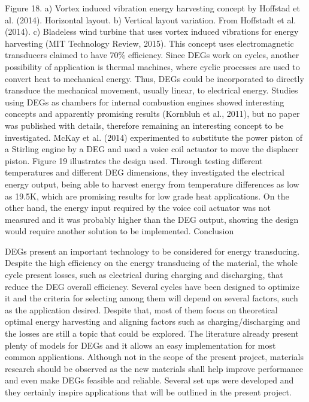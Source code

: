 Figure 18. a) Vortex induced vibration energy harvesting concept by Hoffstad et al. (2014).  Horizontal layout. b) Vertical layout variation. From Hoffstadt et al. (2014). c) Bladeless wind turbine that uses vortex induced vibrations for energy harvesting (MIT Technology Review, 2015). This concept uses electromagnetic transducers claimed to have 70\% efficiency.
     	Since DEGs work on cycles, another possibility of application is thermal machines, where cyclic processes are used to convert heat to mechanical energy. Thus, DEGs could be incorporated to directly transduce the mechanical movement, usually linear, to electrical energy. Studies using DEGs as chambers for internal combustion engines showed interesting concepts and apparently promising results (Kornbluh et al., 2011), but no paper was published with details, therefore remaining an interesting concept to be investigated.  McKay et al. (2014) experimented to substitute the power piston of a Stirling engine by a DEG and used a voice coil actuator to move the displacer piston. Figure 19 illustrates the design used. Through testing different temperatures and different DEG dimensions, they investigated the electrical energy output, being able to harvest energy from temperature differences as low as 19.5K, which are promising results for low grade heat applications. On the other hand, the energy input required by the voice coil actuator was not measured and it was probably higher than the DEG output, showing the design would require another solution to be implemented. 
Conclusion

DEGs present an important technology to be considered for energy transducing.  Despite the high efficiency on the energy transducing of the material, the whole cycle present losses, such as electrical during charging and discharging, that reduce the DEG overall efficiency. Several cycles have been designed to optimize it and the criteria for selecting among them will depend on several factors, such as the application desired. Despite that, most of them focus on theoretical optimal energy harvesting and aligning factors such as charging/discharging and the losses are still a topic that could be explored. The literature already present plenty of models for DEGs and it allows an easy implementation for most common applications. Although not in the scope of the present project, materials research should be observed as the new materials shall help improve performance and even make DEGs feasible and reliable.  Several set ups were developed and they certainly inspire applications that will be outlined in the present project.


